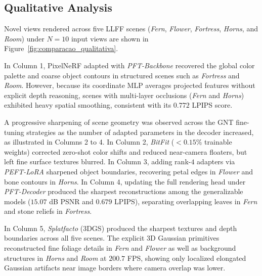 \subsection{Qualitative Analysis}
Novel views rendered across five LLFF scenes (\textit{Fern}, \textit{Flower}, \textit{Fortress}, \textit{Horns}, and \textit{Room}) under $N=10$ input views are shown in Figure~\ref{fig:comparacao_qualitativa}.

In Column 1, PixelNeRF adapted with \textit{PFT-Backbone} recovered the global color palette and coarse object contours in structured scenes such as \textit{Fortress} and \textit{Room}. However, because its coordinate MLP averages projected features without explicit depth reasoning, scenes with multi-layer occlusions (\textit{Fern} and \textit{Horns}) exhibited heavy spatial smoothing, consistent with its $0.772$ LPIPS score.

A progressive sharpening of scene geometry was observed across the GNT fine-tuning strategies as the number of adapted parameters in the decoder increased, as illustrated in Columns 2 to 4. In Column 2, \textit{BitFit} ($<0.15\%$ trainable weights) corrected zero-shot color shifts and reduced near-camera floaters, but left fine surface textures blurred. In Column 3, adding rank-$4$ adapters via \textit{PEFT-LoRA} sharpened object boundaries, recovering petal edges in \textit{Flower} and bone contours in \textit{Horns}. In Column 4, updating the full rendering head under \textit{PFT-Decoder} produced the sharpest reconstructions among the generalizable models ($15.07$ dB PSNR and $0.679$ LPIPS), separating overlapping leaves in \textit{Fern} and stone reliefs in \textit{Fortress}.

In Column 5, \textit{Splatfacto} (3DGS) produced the sharpest textures and depth boundaries across all five scenes. The explicit 3D Gaussian primitives reconstructed fine foliage details in \textit{Fern} and \textit{Flower} as well as background structures in \textit{Horns} and \textit{Room} at $200.7$ FPS, showing only localized elongated Gaussian artifacts near image borders where camera overlap was lower.

